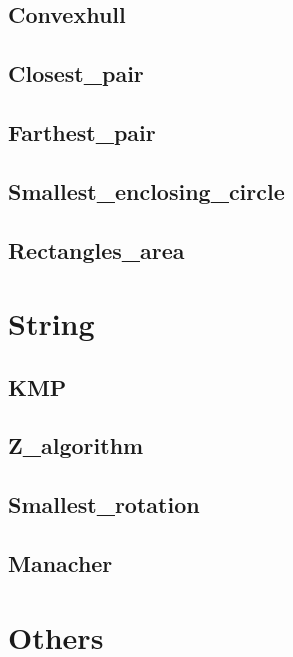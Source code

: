     \subsection{Convexhull}
        
    \subsection{Closest\_pair}
        
    \subsection{Farthest\_pair}
        
    \subsection{Smallest\_enclosing\_circle}
        
    \subsection{Rectangles\_area}
        

\section{String}
    \subsection{KMP}
        
    \subsection{Z\_algorithm}
        
    \subsection{Smallest\_rotation}
        
    \subsection{Manacher}
        


\section{Others}
